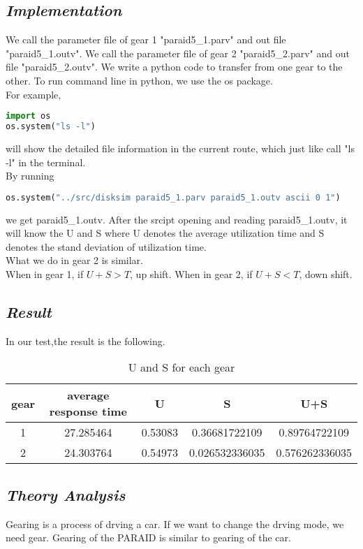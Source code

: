 \documentclass[conference]{IEEEtran}
\begin{document}
\subsection{\emph{\textbf{Implementation}}}
We call the parameter file of gear 1 "paraid5\_1.parv" and out file "paraid5\_1.outv". We call the parameter file of gear 2 "paraid5\_2.parv" and out file "paraid5\_2.outv". We write a python code to transfer from one gear to the other. To run command line in python, we use the os package.\\
For example,
\lstset{flexiblecolumns,showstringspaces=false,numbers=left,numberstyle=\footnotesize,frame=single,breaklines=ture}
\begin{lstlisting}[language=Python]
import os
os.system("ls -l")
\end{lstlisting} 
will show the detailed file information in the current route, which just like call "ls -l" in the terminal.\\
By running
\begin{lstlisting}[language=Python]
os.system("../src/disksim paraid5_1.parv paraid5_1.outv ascii 0 1")
\end{lstlisting}
we get paraid5\_1.outv. After the srcipt opening and reading paraid5\_1.outv, it will know the U and S where U denotes the average utilization time and S denotes the stand deviation of utilization time.\\
What we do in gear 2 is similar.\\
When in gear 1, if $U+S>T$, up shift. When in gear 2, if $U+S<T$, down shift.\\
\subsection{\emph{\textbf{Result}}}
In our test,the result is the following.\\
\begin{table}[H]
\centering
\begin{tabular}{ccccc}
\hline
gear		&average response time		&U			&S 				&U+S			\\ \hline
1					&27.285464					&0.53083	&0.36681722109 	&0.89764722109	\\ \hline
2					&24.303764					&0.54973	&0.026532336035	&0.576262336035	\\ \hline
\end{tabular}
\caption{U and S for each gear}
\end{table}
\subsection{\emph{\textbf{Theory Analysis}}}
Gearing is a process of drving a car. If we want to change the drving mode, we need gear. Gearing of the PARAID is similar to gearing of the car.\\
\end{document}
